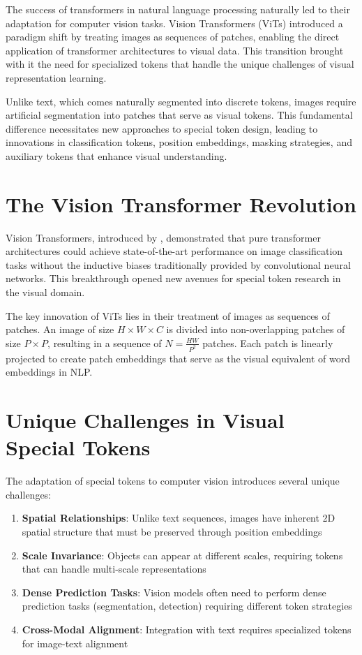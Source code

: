 
The success of transformers in natural language processing naturally led to their adaptation for computer vision tasks. Vision Transformers (ViTs) introduced a paradigm shift by treating images as sequences of patches, enabling the direct application of transformer architectures to visual data. This transition brought with it the need for specialized tokens that handle the unique challenges of visual representation learning.

Unlike text, which comes naturally segmented into discrete tokens, images require artificial segmentation into patches that serve as visual tokens. This fundamental difference necessitates new approaches to special token design, leading to innovations in classification tokens, position embeddings, masking strategies, and auxiliary tokens that enhance visual understanding.

\section{The Vision Transformer Revolution}

Vision Transformers, introduced by \citet{dosovitskiy2020image}, demonstrated that pure transformer architectures could achieve state-of-the-art performance on image classification tasks without the inductive biases traditionally provided by convolutional neural networks. This breakthrough opened new avenues for special token research in the visual domain.

The key innovation of ViTs lies in their treatment of images as sequences of patches. An image of size $H \times W \times C$ is divided into non-overlapping patches of size $P \times P$, resulting in a sequence of $N = \frac{HW}{P^2}$ patches. Each patch is linearly projected to create patch embeddings that serve as the visual equivalent of word embeddings in NLP.

\section{Unique Challenges in Visual Special Tokens}

The adaptation of special tokens to computer vision introduces several unique challenges:

\begin{enumerate}
\item \textbf{Spatial Relationships}: Unlike text sequences, images have inherent 2D spatial structure that must be preserved through position embeddings
\item \textbf{Scale Invariance}: Objects can appear at different scales, requiring tokens that can handle multi-scale representations
\item \textbf{Dense Prediction Tasks}: Vision models often need to perform dense prediction tasks (segmentation, detection) requiring different token strategies
\item \textbf{Cross-Modal Alignment}: Integration with text requires specialized tokens for image-text alignment
\end{enumerate}


